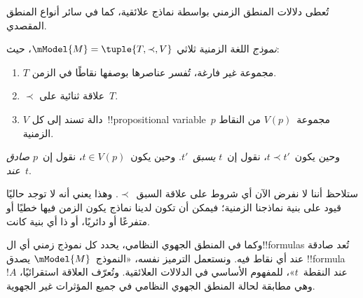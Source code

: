 \documentclass[../../../include/open-logic-section]{subfiles}
\begin{document}
تُعطى دلالات المنطق الزمني بواسطة نماذج علائقية، كما في سائر أنواع المنطق
المقصدي.

\begin{defn}
  \emph{نموذج} اللغة الزمنية ثلاثي
  $\mModel{M}=\tuple{T,\prec,V}$، حيث:
  \begin{enumerate}
  \item $T$ مجموعة غير فارغة، تُفسر عناصرها بوصفها نقاطًا في الزمن.
  \item $\prec$ علاقة ثنائية على~$T$.
  \item $V$ دالة تسند إلى كل~!!{propositional
    variable}~$p$ مجموعة~$V(p)$ من النقاط الزمنية.
  \end{enumerate}
  وحين يكون~$t \prec t'$، نقول إن~$t$ \emph{يسبق}~$t'$.
  وحين يكون~$t \in V(p)$، نقول إن~$p$ \emph{صادق عند}~$t$.
\end{defn}

ستلاحظ أننا لا نفرض الآن أي شروط على علاقة السبق~$\prec$. وهذا يعني أنه
لا توجد حاليًا قيود على بنية نماذجنا الزمنية؛ فيمكن أن تكون لدينا نماذج
يكون الزمن فيها خطيًا أو متفرعًا أو دائريًا، أو ذا أي بنية كانت.

وكما في المنطق الجهوي النظامي، يحدد كل نموذج زمني أي ال!!{formula}s تُعد
صادقة عند أي نقاط فيه. ونستعمل الترميز نفسه، «النموذج~$\mModel{M}$ يصدق
!!{formula}~$!A$ عند النقطة~$t$»، للمفهوم الأساسي في الدلالات العلائقية.
وتُعرّف العلاقة استقرائيًا، وهي مطابقة لحالة المنطق الجهوي النظامي في جميع
المؤثرات غير الجهوية.
\end{document}
